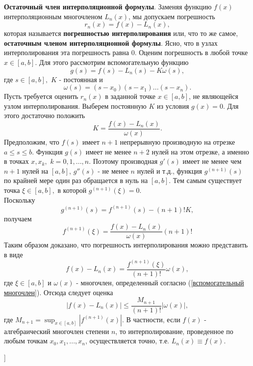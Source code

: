 \textbf{Остаточный член интерполяционной формулы}. Заменяя функцию $f(x)$ интерполяционным многочленом $L_n(x)$, мы допускаем погрешность
\begin{equation*}
    r_n(x) = f(x) - L_n(x),
\end{equation*}
которая называется \textbf{погрешностью интерполирования} или, что то же самое, \textbf{остаточным членом интерполяционной формулы}. Ясно, что в узлах интерполирования эта погрешность равна 0. Оценим погрешность в любой точке $x \in [a,b]$. Для этого рассмотрим вспомогательную функцию
\begin{equation*}
    g(s) = f(s) - L_n(s) - K\omega(s),
\end{equation*}
где $s \in [a,b],$ $K$ - постоянная и
\begin{equation}
    \label{вспомогательный многочлен}
    \omega(s) = (s-x_0)(s-x_1)...(s-x_n).
\end{equation}
Пусть требуется оценить $r_n(x)$ в заданной точке $x \in [a,b]$, не являющейся узлом интерполирования. Выберем постоянную $K$ из условия $g(x)=0.$ Для этого достаточно положить
\begin{equation*}
    K = \frac{f(x)-L_n(x)}{\omega(x)}.
\end{equation*}
Предположим, что $f(s)$ имеет $n+1$ непрерывную производную на отрезке $a \leq s \leq b.$ Функция $g(s)$ имеет не менее $n+2$ нулей на этом отрезке, а именно в точках $x, x_k,$ $k=0,1,...,n$. Поэтому производная $g'(s)$ имеет не менее чем $n+1$ нулей на $[a,b]$, $g''(s)$ - не менее $n$ нулей и т.д., функция $g^{(n+1)}(s)$ по крайней мере один раз обращается в нуль на $[a,b].$ Тем самым существует точка $\xi \in [a,b], $ в которой $g^{(n+1)}(\xi)=0$. \\
Поскольку
\begin{equation*}
    g^{(n+1)}(s) = f^{(n+1)}(s)-(n+1)!K,
\end{equation*}
получаем
\begin{equation*}
    f^{(n+1)}(\xi) = \frac{f(x)-L_n(x)}{\omega (x)} (n+1)!
\end{equation*}
Таким образом доказано, что погрешность интерполирования можно представить в виде
\begin{equation*}
    f(x)-L_n(x) = \frac{f^{(n+1)}(\xi)}{(n+1)!}\omega(x),
\end{equation*}
где $\xi \in [a,b]$ и $\omega(x)$ - многочлен, определенный согласно (\ref{вспомогательный многочлен}).
Отсюда следует оценка
\begin{equation*}
    |f(x)-L_n(x)| \leq \frac{M_{n+1}}{(n+1)!} |\omega(x)|,
\end{equation*}
где $M_{n+1} = \sup_{x \in [a,b]}|f^{(n+1)}(x)|.$ В частности, если $f(x)$ - алгебраический многочлен степени $n$, то интерполирование, проведенное по любым точкам $x_0, x_1, ..., x_n$, осуществляется точно, т.е. $L_n(x) \equiv f(x).$


\bigbreak
[\cite[page 127-129, 132-133]{Samarski}]
